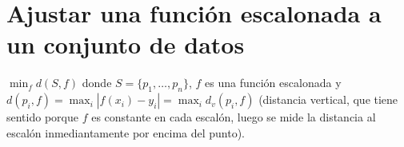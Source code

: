 \documentclass[TGyGC.tex]{subfiles}
\begin{document}
\section{Ajustar una función escalonada a un conjunto de datos}
$\min_f d(S,f)$ donde $S=\{p_1,\dots, p_n\}$, $f$ es una función escalonada y $d(p_i,f)=\max_i|f(x_i)-y_i|=\max_id_v(p_i,f)$ (distancia vertical, que tiene sentido porque $f$ es constante en cada escalón, luego se mide la distancia al escalón inmediantamente por encima del punto). 
\end{document}
